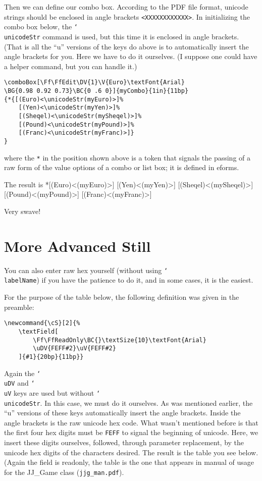 \documentclass{article}
\newcommand{\cs}[1]{\texttt{\char`\\#1}}
\newcommand{\cS}[2]{\textField[\Ff\FfReadOnly\textSize{10}\textFont{Arial}\uDV{FEFF#2}\uV{FEFF#2}\BC{}]{#1}{20bp}{11bp}}
\begin{document}

Then we can define our combo box.  According to the PDF file format,
unicode strings should be enclosed in angle brackets
\verb!<XXXXXXXXXXXX>!. In initializing the combo box below, the
\cs{unicodeStr} command is used, but this time it is enclosed in
angle brackets. (That is all the ``u'' versions of the keys do above
is to automatically insert the angle brackets for you. Here we have
to do it ourselves. (I suppose one could have a helper command, but
you can handle it.)
\begin{verbatim}
\comboBox[\Ff\FfEdit\DV{1}\V{Euro}\textFont{Arial}
\BG{0.98 0.92 0.73}\BC{0 .6 0}]{myCombo}{1in}{11bp}
{*{[(Euro)<\unicodeStr(myEuro)>]%
    [(Yen)<\unicodeStr(myYen)>]%
    [(Sheqel)<\unicodeStr(mySheqel)>]%
    [(Pound)<\unicodeStr(myPound)>]%
    [(Franc)<\unicodeStr(myFranc)>]}
}
\end{verbatim}
where the \texttt{*} in the position shown above is a token that signals the
passing of a raw form of the value options of a combo or list box; it is
defined in \textsf{eforms}.

The result is
{*{[(Euro)<\unicodeStr(myEuro)>]%
    [(Yen)<\unicodeStr(myYen)>]%
    [(Sheqel)<\unicodeStr(mySheqel)>]%
    [(Pound)<\unicodeStr(myPound)>]%
    [(Franc)<\unicodeStr(myFranc)>]}
}

Very swave!

\section{More Advanced Still}

You can also enter raw hex yourself (without using \cs{labelName}) if you have the patience to do
it, and  in some cases, it is the easiest.

For the purpose of the table below, the following definition was given in the preamble:

\begin{verbatim}
\newcommand{\cS}[2]{%
    \textField[
        \Ff\FfReadOnly\BC{}\textSize{10}\textFont{Arial}
        \uDV{FEFF#2}\uV{FEFF#2}
    ]{#1}{20bp}{11bp}}
\end{verbatim}
Again the \cs{uDV} and \cs{uV} keys are used but without
\cs{unicodeStr}. In this case, we must do it ourselves. As was
mentioned earlier, the ``u'' versions of these keys automatically
insert the angle brackets. Inside the angle brackets is the raw
unicode hex code. What wasn't mentioned before is that the first
four hex digits must be \texttt{FEFF} to signal the beginning of
unicode. Here, we insert these digits ourselves, followed, through
parameter replacement, by the unicode hex digits of the characters
desired. The result is the table you see below. (Again the field is
readonly, the table is the one that appears in manual of usage for the
JJ\_Game class (\texttt{jjg\_man.pdf}).
\end{document}
